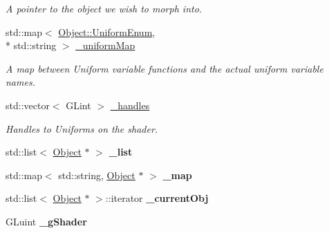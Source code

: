\begin{DoxyCompactItemize}
\begin{DoxyCompactList}\small\item\em A pointer to the object we wish to morph into. \end{DoxyCompactList}\item 
std\-::map$<$ \hyperlink{class_object_a79b74057dbc5182b85c9c3ba8480fcf2}{Object\-::\-Uniform\-Enum}, \\*
std\-::string $>$ \hyperlink{class_object_a6378d0b0eeec23045ae2a5245e42bf13}{\-\_\-uniform\-Map}
\begin{DoxyCompactList}\small\item\em A map between Uniform variable functions and the actual uniform variable names. \end{DoxyCompactList}\item 
std\-::vector$<$ G\-Lint $>$ \hyperlink{class_object_a983963f564898beca4bda99676245663}{\-\_\-handles}
\begin{DoxyCompactList}\small\item\em Handles to Uniforms on the shader. \end{DoxyCompactList}\item 
\hypertarget{class_scene_acdd0123ca6b2d64d8d447bb485b235fc}{std\-::list$<$ \hyperlink{class_object}{Object} $\ast$ $>$ {\bfseries \-\_\-list}}\label{class_scene_acdd0123ca6b2d64d8d447bb485b235fc}

\item 
\hypertarget{class_scene_a8bd5d86484a12255b26b92b6cbf8d29a}{std\-::map$<$ std\-::string, \hyperlink{class_object}{Object} $\ast$ $>$ {\bfseries \-\_\-map}}\label{class_scene_a8bd5d86484a12255b26b92b6cbf8d29a}

\item 
\hypertarget{class_scene_ae87ca5350fcc595f3f15a4fd3c39f3d9}{std\-::list$<$ \hyperlink{class_object}{Object} $\ast$ $>$\-::iterator {\bfseries \-\_\-current\-Obj}}\label{class_scene_ae87ca5350fcc595f3f15a4fd3c39f3d9}

\item 
\hypertarget{class_scene_a8f9bdd8ec5edb1f414fbd314a36e2724}{G\-Luint {\bfseries \-\_\-g\-Shader}}\label{class_scene_a8f9bdd8ec5edb1f414fbd314a36e2724}

\end{DoxyCompactItemize}
